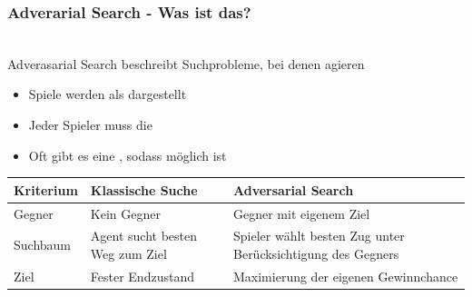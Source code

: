 \subsubsection*{Adverarial Search - Was ist das?}
\\
Adverasarial Search beschreibt Suchprobleme, bei denen  agieren\\
\begin{itemize}
    \item Spiele werden als  dargestellt
    \item Jeder Spieler muss die 
    \item Oft gibt es eine , sodass  möglich ist
\end{itemize}
\begin{table}[H]
    \centering
    \renewcommand{\arraystretch}{1.2}
    \begin{tabular}{lll}
        \toprule
        Kriterium & Klassische Suche & Adversarial Search\\
        \midrule
        Gegner & Kein Gegner & Gegner mit eigenem Ziel\\
        Suchbaum & Agent sucht besten Weg zum Ziel & Spieler wählt besten Zug unter Berücksichtigung des Gegners\\
        Ziel & Fester Endzustand & Maximierung der eigenen Gewinnchance\\
        \bottomrule
    \end{tabular}
\end{table}
